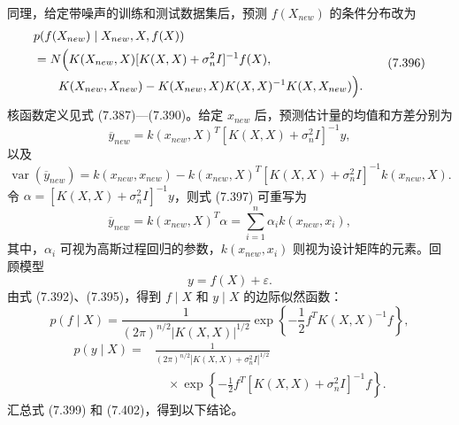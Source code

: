 同理，给定带噪声的训练和测试数据集后，预测 $f(X_{new})$ 的条件分布改为
\begin{equation}
\begin{aligned}
&p(f(X_{new})\mid X_{new},X,f(X))\\
&=N\Bigl(K(X_{new},X)[K(X,X)+\sigma_n^2I]^{-1}f(X),\\
&\qquad K(X_{new},X_{new})-K(X_{new},X)K(X,X)^{-1}K(X,X_{new})\Bigr).
\end{aligned}
\tag{7.396}
\end{equation}
核函数定义见式 (7.387)—(7.390)。给定 $x_{new}$ 后，预测估计量的均值和方差分别为
\begin{equation}
\overline y_{new}=k(x_{new},X)^T[K(X,X)+\sigma_n^2I]^{-1}y,
\tag{7.397}
\end{equation}
以及
\begin{equation}
\operatorname{var}(\overline y_{new})=k(x_{new},x_{new})
-k(x_{new},X)^T[K(X,X)+\sigma_n^2I]^{-1}k(x_{new},X).
\tag{7.398}
\end{equation}
令 $\alpha=[K(X,X)+\sigma_n^2I]^{-1}y$，则式 (7.397) 可重写为
\begin{equation}
\overline y_{new}=k(x_{new},X)^T\alpha=\sum_{i=1}^{n}\alpha_i k(x_{new},x_i),
\tag{7.399}
\end{equation}
其中，$\alpha_i$ 可视为高斯过程回归的参数，$k(x_{new},x_i)$ 则视为设计矩阵的元素。回顾模型
\begin{equation}
y=f(X)+\varepsilon.
\tag{7.400}
\end{equation}
由式 (7.392)、(7.395)，得到 $f\mid X$ 和 $y\mid X$ 的边际似然函数：
\begin{equation}
p(f\mid X)=\frac1{(2\pi)^{n/2}|K(X,X)|^{1/2}}
\exp\left\{-\frac12f^TK(X,X)^{-1}f\right\},
\tag{7.401}
\end{equation}
\begin{equation}
\begin{aligned}
p(y\mid X)={}&\frac1{(2\pi)^{n/2}|K(X,X)+\sigma_n^2I|^{1/2}}\\
&\quad\times\exp\left\{-\frac12f^T[K(X,X)+\sigma_n^2I]^{-1}f\right\}.
\end{aligned}
\tag{7.402}
\end{equation}
汇总式 (7.399) 和 (7.402)，得到以下结论。
